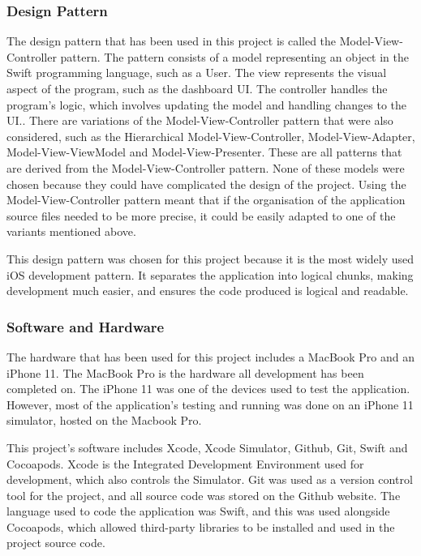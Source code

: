 	            \subsubsection{Design Pattern}
	                The design pattern that has been used in this project is called the Model-View-Controller pattern.  The pattern consists of a model representing an object in the Swift programming language, such as a User.  The view represents the visual aspect of the program, such as the dashboard UI. The controller handles the program's logic, which involves updating the model and handling changes to the UI.\cite{mvc_tutorialspoint}.  There are variations of the Model-View-Controller pattern that were also considered, such as the Hierarchical Model-View-Controller, Model-View-Adapter, Model-View-ViewModel and Model-View-Presenter.  These are all patterns that are derived from the  Model-View-Controller pattern.  None of these models were chosen because they could have complicated the design of the project. Using the Model-View-Controller pattern meant that if the organisation of the application source files needed to be more precise, it could be easily adapted to one of the variants mentioned above.

	                
	                
	                This design pattern was chosen for this project because it is the most widely used iOS development pattern.  It separates the application into logical chunks, making development much easier, and ensures the code produced is logical and readable.
	        
	            \subsubsection{Software and Hardware}
	                The hardware that has been used for this project includes a MacBook Pro and an iPhone 11.  The MacBook Pro is the hardware all development has been completed on.  The iPhone 11 was one of the devices used to test the application. However, most of the application's testing and running was done on an iPhone 11 simulator, hosted on the Macbook Pro.
	                
	                This project's software includes Xcode, Xcode  Simulator, Github, Git, Swift and Cocoapods.  Xcode is the Integrated Development Environment used for development, which also controls the Simulator.  Git was used as a version control tool for the project, and all source code was stored on the Github website.  The language used to code the application was Swift, and this was used alongside Cocoapods, which allowed third-party libraries to be installed and used in the project source code.
	            
